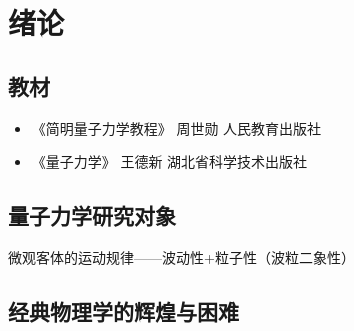 \chapter{绪论}

\section{教材}

\begin{itemize}
\item 《简明量子力学教程》 周世勋 人民教育出版社
\item 《量子力学》 王德新 湖北省科学技术出版社
\end{itemize}

\section{量子力学研究对象}

微观客体的运动规律——波动性+粒子性（波粒二象性）

\section{经典物理学的辉煌与困难}



